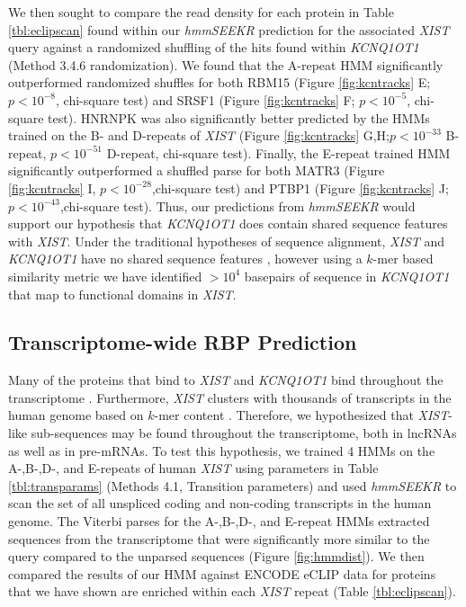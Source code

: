 We then sought to compare the read density for each protein in Table \ref{tbl:eclipscan} found within our \emph{hmmSEEKR} prediction for the associated \emph{XIST} query against a randomized shuffling of the hits found within \emph{KCNQ1OT1} (Method 3.4.6 randomization). We found that the A-repeat HMM significantly outperformed randomized shuffles for both RBM15 (Figure \ref{fig:kcntracks} E; $p< 10^{-8}$, chi-square test) and SRSF1 (Figure \ref{fig:kcntracks} F; $p< 10^{-5}$, chi-square test). HNRNPK was also significantly better predicted by the HMMs trained on the B- and D-repeats of \emph{XIST} (Figure \ref{fig:kcntracks} G,H;$p<10^{-33}$ B-repeat, $p<10^{-51}$ D-repeat, chi-square test). Finally, the E-repeat trained HMM significantly outperformed a shuffled parse for both MATR3 (Figure \ref{fig:kcntracks} I, $p<10^{-28}$,chi-square test) and PTBP1 (Figure \ref{fig:kcntracks} J; $p<10^{-43}$,chi-square test). Thus, our predictions from \textit{hmmSEEKR} would support our hypothesis that \textit{KCNQ1OT1} does contain shared sequence features with \textit{XIST}. Under the traditional hypotheses of sequence alignment, \textit{XIST} and \textit{KCNQ1OT1} have no shared sequence features \cite{Altschul1990BasicTool,Wheeler2013Nhmmer:HMMs,Rice2000EMBOSS:Suite}, however using a $k$-mer based similarity metric we have identified $>10^4$ basepairs of sequence in \textit{KCNQ1OT1} that map to functional domains in \textit{XIST}. 

\clearpage



\subsection{Transcriptome-wide RBP Prediction}
Many of the proteins that bind to \emph{XIST} and \emph{KCNQ1OT1} bind throughout the transcriptome \cite{VanNostrand2016RobusteCLIP}. Furthermore, \emph{XIST} clusters with thousands of transcripts in the human genome based on $k$-mer content \cite{Kirk2018FunctionalContent}. Therefore, we hypothesized that \emph{XIST}-like sub-sequences may be found throughout the transcriptome, both in lncRNAs as well as in pre-mRNAs. To test this hypothesis, we trained 4 HMMs on the A-,B-,D-, and E-repeats of human \emph{XIST} using parameters in Table \ref{tbl:transparams} (Methods 4.1, Transition parameters) and used \emph{hmmSEEKR} to scan the set of all unspliced coding and non-coding transcripts in the human genome. The Viterbi parses for the A-,B-,D-, and E-repeat HMMs extracted sequences from the transcriptome that were significantly more similar to the query compared to the unparsed sequences (Figure \ref{fig:hmmdist}).  We then compared the results of our HMM against ENCODE eCLIP data for proteins that we have shown are enriched within each \emph{XIST} repeat (Table \ref{tbl:eclipscan}). 


